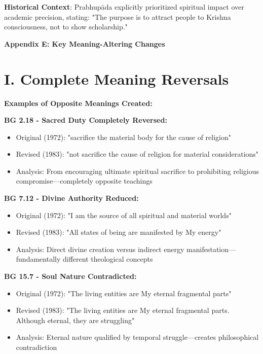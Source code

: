 \documentclass[11pt,twoside]{book}
\begin{document}
\textbf{\textbf{Historical Context}}: Prabhupāda explicitly prioritized spiritual impact over academic precision, stating: "The purpose is to attract people to Krishna consciousness, not to show scholarship."

\clearpage
\pagestyle{sectionopening}
\thispagestyle{sectionopening}
\markboth{}{}
\markright{}
\vspace*{0.25\textheight}
\begin{center}
{\Huge\bfseries Appendix E: Key Meaning-Altering Changes}
\end{center}
\newpage
\section*{I. Complete Meaning Reversals}
\label{sec:org1878d54}

\textbf{\textbf{Examples of Opposite Meanings Created:}}

\textbf{\textbf{BG 2.18 - Sacred Duty Completely Reversed:}}
\begin{itemize}
\item Original (1972): "sacrifice the material body for the cause of religion"
\item Revised (1983): "not sacrifice the cause of religion for material considerations"
\item Analysis: From encouraging ultimate spiritual sacrifice to prohibiting religious 
compromise—completely opposite teachings
\end{itemize}

\textbf{\textbf{BG 7.12 - Divine Authority Reduced:}}
\begin{itemize}
\item Original (1972): "I am the source of all spiritual and material worlds"
\item Revised (1983): "All states of being are manifested by My energy"
\item Analysis: Direct divine creation versus indirect energy 
manifestation—fundamentally different theological concepts
\end{itemize}

\textbf{\textbf{BG 15.7 - Soul Nature Contradicted:}}
\begin{itemize}
\item Original (1972): "The living entities are My eternal fragmental parts"
\item Revised (1983): "The living entities are My eternal fragmental parts. Although eternal, they are struggling"
\item Analysis: Eternal nature qualified by temporal struggle—creates philosophical 
contradiction
\end{itemize}
\end{document}
